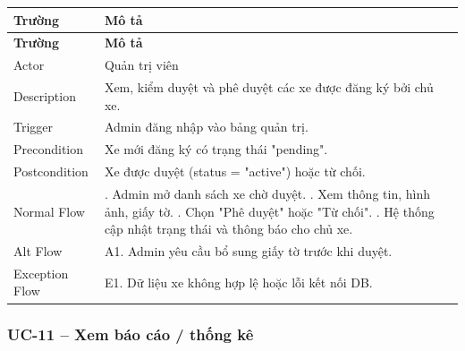 \begin{longtable}{|>{\raggedright\arraybackslash}p{4cm}|>{\raggedright\arraybackslash}p{11cm}|}
\hline
\textbf{Trường} & \textbf{Mô tả} \\
\hline
\endfirsthead

\hline
\textbf{Trường} & \textbf{Mô tả} \\
\hline
\endhead

\hline
\endfoot

Actor & Quản trị viên \\
\hline
Description & Xem, kiểm duyệt và phê duyệt các xe được đăng ký bởi chủ xe. \\
\hline
Trigger & Admin đăng nhập vào bảng quản trị. \\
\hline
Precondition & Xe mới đăng ký có trạng thái "pending". \\
\hline
Postcondition & Xe được duyệt (status = "active") hoặc từ chối. \\
\hline
Normal Flow & 1. Admin mở danh sách xe chờ duyệt. \newline 2. Xem thông tin, hình ảnh, giấy tờ. \newline 3. Chọn "Phê duyệt" hoặc "Từ chối". \newline 4. Hệ thống cập nhật trạng thái và thông báo cho chủ xe. \\
\hline
Alt Flow & A1. Admin yêu cầu bổ sung giấy tờ trước khi duyệt. \\
\hline
Exception Flow & E1. Dữ liệu xe không hợp lệ hoặc lỗi kết nối DB. \\
\hline
\end{longtable}

\subsubsection*{UC-11 – Xem báo cáo / thống kê}

